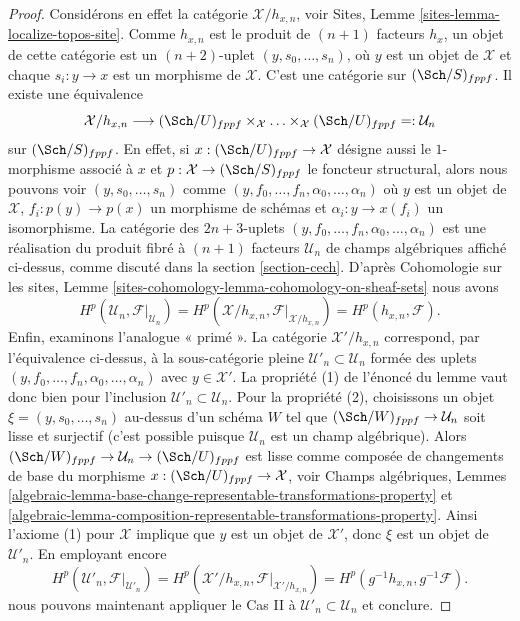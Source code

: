 \begin{proof}
\medskip\noindent
Considérons en effet la catégorie $\mathcal{X}/h_{x, n}$, voir
Sites, Lemme \ref{sites-lemma-localize-topos-site}.
Comme $h_{x, n}$ est le produit de $(n + 1)$ facteurs $h_x$, un
objet de cette catégorie est un $(n + 2)$-uplet
$(y, s_0, \ldots, s_n)$, où $y$ est un objet de $\mathcal{X}$ et chaque
$s_i : y \to x$ est un morphisme de $\mathcal{X}$.
C'est une catégorie sur $(\Sch/S)_{fppf}$. Il existe une équivalence
$$
\mathcal{X}/h_{x, n}
\longrightarrow
(\Sch/U)_{fppf} \times_\mathcal{X} \ldots \times_\mathcal{X} (\Sch/U)_{fppf}
=: \mathcal{U}_n
$$
sur $(\Sch/S)_{fppf}$. En effet, si $x : (\Sch/U)_{fppf} \to \mathcal{X}$ désigne aussi
le $1$-morphisme associé à $x$ et
$p : \mathcal{X} \to (\Sch/S)_{fppf}$ le foncteur structural,
alors nous pouvons voir $(y, s_0, \ldots, s_n)$ comme
$(y, f_0, \ldots, f_n, \alpha_0, \ldots, \alpha_n)$
où $y$ est un objet de $\mathcal{X}$, $f_i : p(y) \to p(x)$ un
morphisme de schémas et $\alpha_i : y \to x(f_i)$ un isomorphisme.
La catégorie des $2n+3$-uplets
$(y, f_0, \ldots, f_n, \alpha_0, \ldots, \alpha_n)$
est une réalisation du produit fibré à $(n + 1)$ facteurs $\mathcal{U}_n$
de champs algébriques affiché ci-dessus, comme discuté dans la
section \ref{section-cech}.
D'après Cohomologie sur les sites, Lemme
\ref{sites-cohomology-lemma-cohomology-on-sheaf-sets}
nous avons
$$
H^p(\mathcal{U}_n, \mathcal{F}|_{\mathcal{U}_n}) =
H^p(\mathcal{X}/h_{x, n}, \mathcal{F}|_{\mathcal{X}/h_{x, n}}) =
H^p(h_{x, n}, \mathcal{F}).
$$
Enfin, examinons l'analogue « primé ». La catégorie
$\mathcal{X}'/h_{x, n}$ correspond, par l'équivalence ci-dessus,
à la sous-catégorie pleine $\mathcal{U}'_n \subset \mathcal{U}_n$
formée des uplets
$(y, f_0, \ldots, f_n, \alpha_0, \ldots, \alpha_n)$
avec $y \in \mathcal{X}'$. La propriété (1) de l'énoncé du
lemme vaut donc bien
pour l'inclusion $\mathcal{U}'_n \subset \mathcal{U}_n$.
Pour la propriété (2), choisissons un objet $\xi = (y, s_0, \ldots, s_n)$
au-dessus d'un schéma $W$ tel que $(\Sch/W)_{fppf} \to \mathcal{U}_n$
soit lisse et surjectif (c'est possible puisque $\mathcal{U}_n$ est
un champ algébrique). Alors
$(\Sch/W)_{fppf} \to \mathcal{U}_n \to (\Sch/U)_{fppf}$
est lisse comme composée de changements de base du morphisme
$x : (\Sch/U)_{fppf} \to \mathcal{X}$, voir
Champs algébriques, Lemmes
\ref{algebraic-lemma-base-change-representable-transformations-property} et
\ref{algebraic-lemma-composition-representable-transformations-property}.
Ainsi l'axiome (1) pour $\mathcal{X}$ implique que $y$ est un objet de
$\mathcal{X}'$, donc $\xi$ est un objet de $\mathcal{U}'_n$.
En employant encore
$$
H^p(\mathcal{U}'_n, \mathcal{F}|_{\mathcal{U}'_n}) =
H^p(\mathcal{X}'/h_{x, n}, \mathcal{F}|_{\mathcal{X}'/h_{x, n}}) =
H^p(g^{-1}h_{x, n}, g^{-1}\mathcal{F}).
$$
nous pouvons maintenant appliquer le Cas II à
$\mathcal{U}'_n \subset \mathcal{U}_n$
et conclure.
\end{proof}








